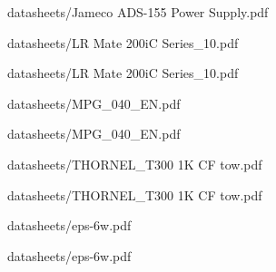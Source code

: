 
            {datasheets/Jameco ADS-155 Power Supply.pdf}

            {datasheets/LR Mate 200iC Series_10.pdf}


            {datasheets/LR Mate 200iC Series_10.pdf}

            {datasheets/MPG_040_EN.pdf}


            {datasheets/MPG_040_EN.pdf}

            {datasheets/THORNEL_T300 1K CF tow.pdf}


            {datasheets/THORNEL_T300 1K CF tow.pdf}

            {datasheets/eps-6w.pdf}


            {datasheets/eps-6w.pdf}
